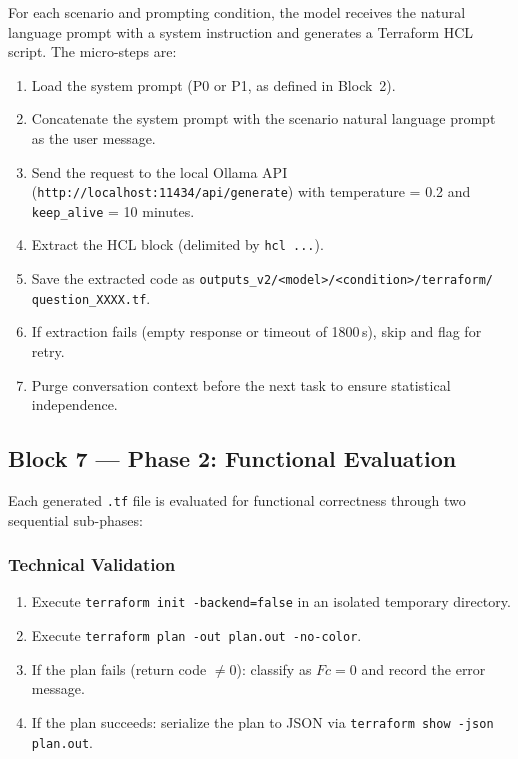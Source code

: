 For each scenario and prompting condition, the model receives the
natural language prompt with a system instruction and generates a
Terraform HCL script. The micro-steps are:

\begin{enumerate}[leftmargin=*]
    \item Load the system prompt (P0 or P1, as defined in Block~2).
    \item Concatenate the system prompt with the scenario natural
          language prompt as the user message.
    \item Send the request to the local Ollama API
          (\texttt{http://localhost:11434/api/generate}) with
          temperature = 0.2 and \texttt{keep\_alive} = 10 minutes.
    \item Extract the HCL block (delimited by \texttt{hcl ...}).
    \item Save the extracted code as
          \texttt{outputs\_v2/<model>/<condition>/terraform/%
          question\_XXXX.tf}.
    \item If extraction fails (empty response or timeout of 1800\,s),
          skip and flag for retry.
    \item Purge conversation context before the next task to ensure
          statistical independence.
\end{enumerate}

\subsection{Block 7 --- Phase 2: Functional Evaluation}
\label{sec:block7}

Each generated \texttt{.tf} file is evaluated for functional
correctness through two sequential sub-phases:

\subsubsection{Technical Validation}

\begin{enumerate}[leftmargin=*]
    \item Execute \texttt{terraform init -backend=false} in an
          isolated temporary directory.
    \item Execute \texttt{terraform plan -out plan.out -no-color}.
    \item If the plan fails (return code $\neq 0$): classify as
          $Fc = 0$ and record the error message.
    \item If the plan succeeds: serialize the plan to JSON via
          \texttt{terraform show -json plan.out}.
\end{enumerate}

